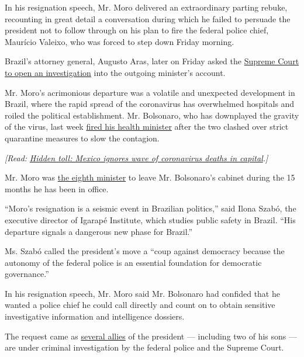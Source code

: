In his resignation speech, Mr. Moro delivered an extraordinary parting
rebuke, recounting in great detail a conversation during which he failed
to persuade the president not to follow through on his plan to fire the
federal police chief, Maurício Valeixo, who was forced to step down
Friday morning.

Brazil's attorney general, Augusto Aras, later on Friday asked the
\href{https://slack-redir.net/link?url=http\%3A\%2F\%2Fwww.mpf.mp.br\%2Fpgr\%2Fnoticias-pgr\%2Faugusto-aras-solicita-inquerito-ao-stf-para-apurar-fatos-narrados-e-declaracoes-de-sergio-moro\%2F}{Supreme
Court to open an investigation} into the outgoing minister's account.

Mr. Moro's acrimonious departure was a volatile and unexpected
development in Brazil, where the rapid spread of the coronavirus has
overwhelmed hospitals and roiled the political establishment. Mr.
Bolsonaro, who has downplayed the gravity of the virus, last week
\href{https://www.nytimes.com/aponline/2020/04/16/world/americas/ap-lt-virus-outbreak-brazil-health-minister.html}{fired
his health minister} after the two clashed over strict quarantine
measures to slow the contagion.

\emph{{[}Read:}
\href{http://www.nytimes.com/2020/05/08/world/americas/mexico-coronavirus-count.html}{\emph{Hidden
toll: Mexico ignores wave of coronavirus deaths in capital}}\emph{.{]}}

Mr. Moro was
\href{https://g1.globo.com/politica/noticia/2020/04/24/veja-os-ministros-que-sairam-do-governo-bolsonaro.ghtml?utm_source=push\&utm_medium=app\&utm_campaign=pushg1}{the
eighth minister} to leave Mr. Bolsonaro's cabinet during the 15 months
he has been in office.

``Moro's resignation is a seismic event in Brazilian politics,'' said
Ilona Szabó, the executive director of Igarapé Institute, which studies
public safety in Brazil. ``His departure signals a dangerous new phase
for Brazil.''

Ms. Szabó called the president's move a ``coup against democracy because
the autonomy of the federal police is an essential foundation for
democratic governance.''

In his resignation speech, Mr. Moro said Mr. Bolsonaro had confided that
he wanted a police chief he could call directly and count on to obtain
sensitive investigative information and intelligence dossiers.

The request came as
\href{https://www.nytimes.com/2019/01/24/world/americas/jair-bolsonaro-davos.html}{several
allies} of the president --- including two of his sons --- are under
criminal investigation by the federal police and the Supreme Court.

